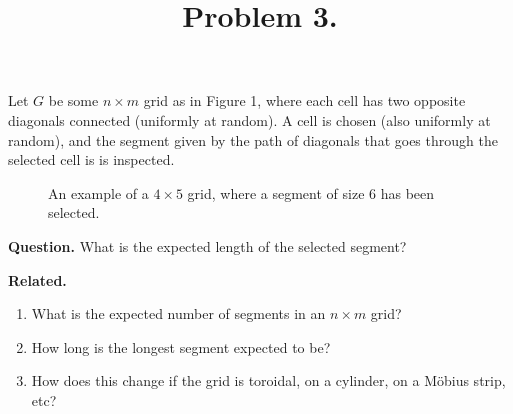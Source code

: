 \documentclass{article}
\newenvironment{question}{\begin{trivlist}\item[\textbf{Question.}]}{\end{trivlist}}
\newenvironment{related}{\begin{trivlist}\item[\textbf{Related.}]\end{trivlist}\begin{enumerate}}{\end{enumerate}}
\begin{document}
\title{Problem 3.}
\date{}
\author{}
\maketitle

  Let $G$ be some $n \times m$ grid as in Figure 1, where each cell has two
  opposite diagonals connected (uniformly at random).
  A cell is chosen (also uniformly at random), and the segment given by the path of
  diagonals that goes through the selected cell is is inspected.
\begin{figure}[!h]
  \centering
  \caption{
    An example of a $4 \times 5$ grid, where a segment of size $6$ has been selected.
  }
\end{figure}

\begin{question}
  What is the expected length of the selected segment?
\end{question}

\begin{related}
  \item What is the expected number of segments in an $n \times m$ grid?
  \item How long is the longest segment expected to be?
  \item How does this change if the grid is toroidal, on a cylinder,
    on a M\"obius strip, etc?
\end{related}
\end{document}
